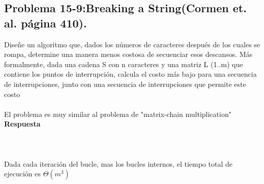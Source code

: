 \documentclass[a4paper,12pt]{article}
\begin{document}
\subsection{Problema 15-9:Breaking a String(Cormen et. al. página 410).}
Diseñe un algoritmo que, dados los números de caracteres después de los cuales se rompa, determine una manera menos costosa de secuenciar esos descansos. Más formalmente, dada una cadena S con n caracteres y una matriz L (1..m) que contiene los puntos de interrupción, calcula el costo más bajo para una secuencia de interrupciones, junto con una secuencia de interrupciones que permite este costo\\\\
El problema es muy similar al problema de "matrix-chain multiplication"\\\clearpage
\textbf{Respuesta}\\\\

\cite{CLRS2}\\\\
Dada cada iteración del bucle, mas los bucles internos, el tiempo total de ejecución es $\Theta(m^3)$
\end{document}
